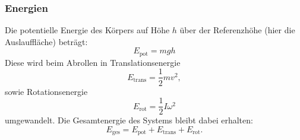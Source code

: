 \subsubsection{Energien} 
Die potentielle Energie des Körpers auf Höhe \(h\) über der Referenzhöhe (hier die Auslauffläche) beträgt:
\begin{equation}
    E_\text{pot} = m g h
    \label{eq:epot}
\end{equation}
Diese wird beim Abrollen in Translationsenergie
\begin{equation}
    E_\text{trans} = \frac{1}{2} m v^2,
    \label{eq:etrans}
\end{equation}
sowie Rotationsenergie
\begin{equation}
    E_\text{rot} = \frac{1}{2} I \omega^2
    \label{eq:erot}
\end{equation}
umgewandelt.  
Die Gesamtenergie des Systems bleibt dabei erhalten:
\begin{equation}
    E_\text{ges} = E_\text{pot} + E_\text{trans} + E_\text{rot}.
    \label{eq:eges}
\end{equation}
